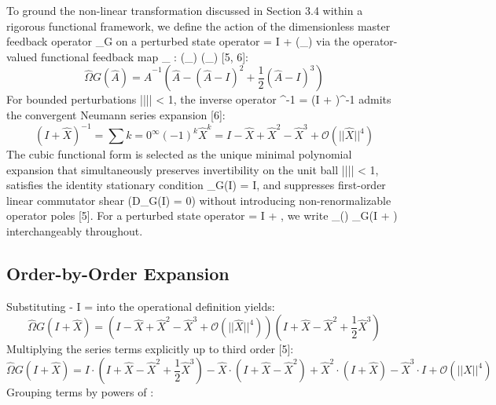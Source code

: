 \documentclass[12pt, a4paper]{article}
\begin{document}
To ground the non-linear transformation discussed in Section 3.4 within a rigorous functional framework, we define the action of the dimensionless master feedback operator \hat{\Omega}_{G} on a perturbed state operator  = I +  \in {}(_{}) via the operator-valued functional feedback map _{\Omega} : (_{}) \rightarrow {}(_{}) [5, 6]:
\begin{equation}
\hat{\Omega}{G}(\hat{A}) = \hat{A}^{-1}\left(\hat{A} - (\hat{A} - I)^{2} + \frac{1}{2}(\hat{A} - I)^{3}\right)
\end{equation}
For bounded perturbations |||| < 1, the inverse operator ^{-1} = (I + )^{-1} admits the convergent Neumann series expansion [6]:
\begin{equation}
(I + \hat{X})^{-1} = \sum{k=0}^{\infty} (-1)^{k}\hat{X}^{k} = I - \hat{X} + \hat{X}^{2} - \hat{X}^{3} + \mathcal{O}(||\hat{X}||^{4})
\end{equation}
The cubic functional form is selected as the unique minimal polynomial expansion that simultaneously preserves invertibility on the unit ball |||| < 1, satisfies the identity stationary condition \hat{\Omega}_{G}(I) = I, and suppresses first-order linear commutator shear (D\hat{\Omega}_{G}(I) = 0) without introducing non-renormalizable operator poles [5]. For a perturbed state operator  = I + , we write _{\Omega}() \equiv \hat{\Omega}_{G}(I + ) interchangeably throughout.
​\subsection{Order-by-Order Expansion}
Substituting  - I =  into the operational definition yields:
\begin{equation}
\hat{\Omega}{G}(I + \hat{X}) = \left(I - \hat{X} + \hat{X}^{2} - \hat{X}^{3} + \mathcal{O}(||\hat{X}||^{4})\right)\left(I + \hat{X} - \hat{X}^{2} + \frac{1}{2}\hat{X}^{3}\right)
\end{equation}
Multiplying the series terms explicitly up to third order [5]:
\begin{equation}
\hat{\Omega}{G}(I + \hat{X}) = I \cdot \left(I + \hat{X} - \hat{X}^{2} + \frac{1}{2}\hat{X}^{3}\right) - \hat{X} \cdot (I + \hat{X} - \hat{X}^{2}) + \hat{X}^{2} \cdot (I + \hat{X}) - \hat{X}^{3} \cdot I + \mathcal{O}(||\hat{X}||^{4})
\end{equation}
Grouping terms by powers of :
\end{document}
